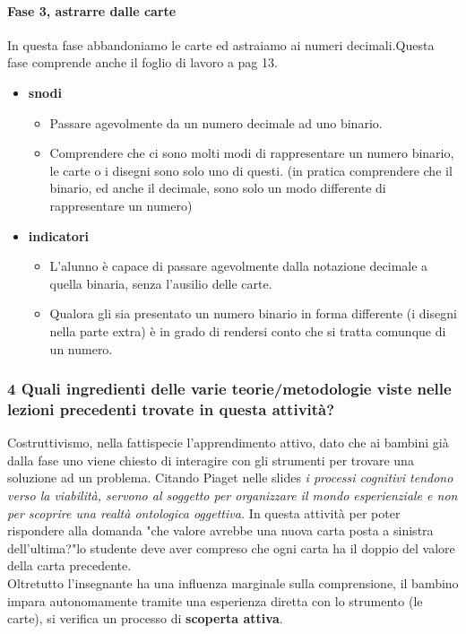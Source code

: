 \documentclass[a4paper]{article}
\begin{document}
\paragraph{Fase 3, astrarre dalle carte}
In questa fase abbandoniamo le carte ed astraiamo ai numeri decimali.Questa fase comprende anche il foglio di lavoro a pag 13.
\begin{itemize}
	\item \textbf{snodi}
		\begin{itemize}[label={--}]
			\item Passare agevolmente da un numero decimale ad uno binario.
			\item Comprendere che ci sono molti modi di rappresentare un numero binario, le carte o i disegni sono solo uno di questi. (in pratica comprendere che il binario, ed anche il decimale, sono solo un modo differente di rappresentare un numero)
		\end{itemize}
	\item \textbf{indicatori}
		\begin{itemize}[label={--}]
			\item L'alunno è capace di passare agevolmente dalla notazione decimale a quella binaria, senza l'ausilio delle carte.
			\item Qualora gli sia presentato un numero binario in forma differente (i disegni nella parte extra) è in grado di rendersi conto che si tratta comunque di un numero.
		\end{itemize}
\end{itemize}
\subsubsection{4 Quali ingredienti delle varie teorie/metodologie viste nelle lezioni precedenti trovate in questa attività?}
Costruttivismo, nella fattispecie l'apprendimento attivo, dato che ai bambini già dalla fase uno viene chiesto di interagire con gli strumenti per trovare una soluzione ad un problema. Citando Piaget nelle slides \emph{i processi cognitivi tendono verso la viabilità, servono al soggetto per organizzare il mondo esperienziale e non per scoprire una realtà ontologica oggettiva.}
In questa attività per poter rispondere alla domanda "che valore avrebbe una nuova carta posta a sinistra dell'ultima?"lo studente deve aver compreso che ogni carta ha il doppio del valore della carta precedente.\\
Oltretutto l'insegnante ha una influenza marginale sulla comprensione, il bambino impara autonomamente tramite una esperienza diretta con lo strumento (le carte), si verifica un processo di \textbf{scoperta attiva}.\\
\end{document}
